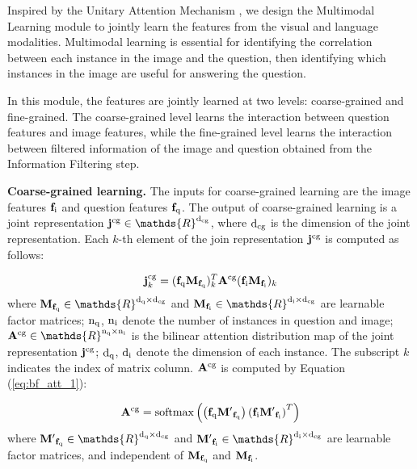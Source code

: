 \documentclass[10pt,twocolumn,letterpaper]{article}
\newcommand{\softmax}{\mathrm{softmax}}
\begin{document}
Inspired by the Unitary Attention Mechanism \cite{Kim2018BilinearAN}, we design the Multimodal Learning module to jointly learn the features from the visual and language modalities. Multimodal learning is essential for identifying the correlation between each instance in the image and the question, then identifying which instances in the image are useful for answering the question.







In this module, the features are jointly learned at two levels: coarse-grained and fine-grained. The coarse-grained level learns the interaction between question features and image features, while the fine-grained level learns the interaction between filtered information of the image and question obtained from the Information Filtering step.





\textbf{Coarse-grained learning.} The inputs for coarse-grained learning are the image features $\mathbf{f}_{\rm i}$ and question features $\mathbf{f}_{\rm q}$. The output of coarse-grained learning is a joint representation $\mathbf{j}^{\rm cg} \in \mathds{R}^{\rm d_{cg}}$, where $\rm d_{cg}$ is the dimension of the joint representation. Each $k$-th element  of the join representation $\mathbf{j}^{\rm cg}$ is computed as follows:

\begin{equation}
\begin{aligned}
\mathbf{j}_k^{\rm cg} = (\mathbf{f}_{\rm q}\mathbf{M}_{\mathbf{f}_{\rm q}})^T_k\mathbf{A}^{\rm cg}(\mathbf{f}_{\rm i}\mathbf{M}_{\mathbf{f}_{\rm i}})_k
\end{aligned}
\label{eq:bf_fuse_1}
\end{equation}
where $\mathbf{M}_{\mathbf{f}_{\rm q}} \in \mathds{R}^{\rm d_q \times d_{cg}}$ and $\mathbf{M}_{\mathbf{f}_{\rm i}}\in \mathds{R}^{\rm d_i \times d_{cg}}$ are learnable factor matrices; $\rm n_q$, $\rm n_i$ denote the number of instances in question and image;  $\mathbf{A}^{\rm cg} \in \mathds{R}^{\rm n_q \times n_i} $ is the bilinear attention distribution map of the joint representation $\mathbf{j}^{\rm cg}$; $\rm d_q$, $\rm d_i$ denote the dimension of each instance. The subscript $k$ indicates the index of matrix column. $\mathbf{A}^{\rm cg}$ is computed by Equation (\ref{eq:bf_att_1}):

\begin{equation}
\begin{aligned}
\mathbf{A}^{\rm cg} = \softmax\left(\left(\mathbf{f}_{\rm q}\mathbf{M'}_{\mathbf{f}_{\rm q}}\right)\left(\mathbf{f}_{\rm i}\mathbf{M'}_{\mathbf{f}_{\rm i}}\right)^T\right)
\end{aligned}
\label{eq:bf_att_1}
\end{equation}
where $\mathbf{M'}_{\mathbf{f}_{\rm q}}\in \mathds{R}^{\rm d_q \times d_{cg}}$ and $\mathbf{M'}_{\mathbf{f}_{\rm i}}\in \mathds{R}^{\rm d_i \times d_{cg}}$ are learnable factor matrices, and independent of $\mathbf{M}_{\mathbf{f}_{\rm q}}$ and $\mathbf{M}_{\mathbf{f}_{\rm i}}$.
\end{document}
